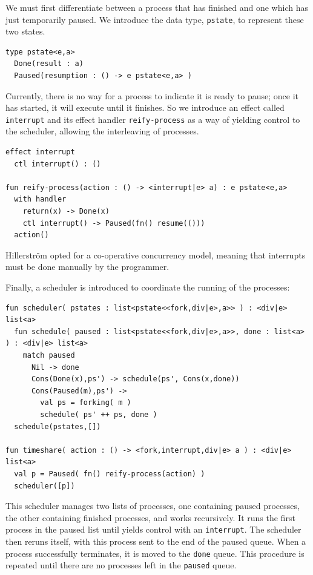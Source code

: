 \documentclass[logo,bsc,singlespacing,parskip]{infthesis}
\begin{document}
We must first differentiate between a process that has finished and one which has just temporarily paused. We introduce the data type, \lstinline{pstate}, to represent these two states.
\begin{lstlisting}
type pstate<e,a>
  Done(result : a)
  Paused(resumption : () -> e pstate<e,a> )
\end{lstlisting}

Currently, there is no way for a process to indicate it is ready to pause; once it has started, it will execute until it finishes. So we introduce an effect called \lstinline{interrupt} and its effect handler \lstinline{reify-process} as a way of yielding control to the scheduler, allowing the interleaving of processes.

\begin{lstlisting}
effect interrupt
  ctl interrupt() : ()

fun reify-process(action : () -> <interrupt|e> a) : e pstate<e,a> 
  with handler  
    return(x) -> Done(x)
    ctl interrupt() -> Paused(fn() resume(()))
  action()
\end{lstlisting}
Hillerström opted for a co-operative concurrency model, meaning that interrupts must be done manually by the programmer. 

Finally, a scheduler is introduced to coordinate the running of the processes: 
\begin{lstlisting}
fun scheduler( pstates : list<pstate<<fork,div|e>,a>> ) : <div|e> list<a>
  fun schedule( paused : list<pstate<<fork,div|e>,a>>, done : list<a> ) : <div|e> list<a>
    match paused
      Nil -> done
      Cons(Done(x),ps') -> schedule(ps', Cons(x,done))
      Cons(Paused(m),ps') ->
        val ps = forking( m )
        schedule( ps' ++ ps, done )
  schedule(pstates,[])

fun timeshare( action : () -> <fork,interrupt,div|e> a ) : <div|e> list<a>
  val p = Paused( fn() reify-process(action) )
  scheduler([p])
\end{lstlisting}
This scheduler manages two lists of processes, one containing paused processes, the other containing finished processes, and works recursively. It runs the first process in the paused list until yields control with an \lstinline{interrupt}. The scheduler then reruns itself, with this process sent to the end of the paused queue. When a process successfully terminates, it is moved to the \lstinline{done} queue. This procedure is repeated until there are no processes left in the \lstinline{paused} queue.
\end{document}
